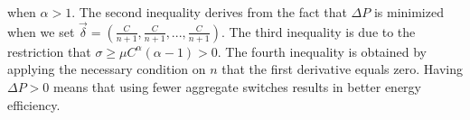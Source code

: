 \documentclass[journal,single-space,two column,twoside,10pt]{IEEEtran}
\begin{document}
when $\alpha > 1$. The second inequality derives from the fact that $\Delta P$ is minimized when we set $\vec{\delta} = \left( \frac{C}{n+1}, \frac{C}{n+1},..., \frac{C}{n+1} \right)$. The third inequality is due to the restriction that $\sigma \geq \mu C^{\alpha}(\alpha - 1) > 0$. The fourth inequality is obtained by applying the necessary condition on $n$ that the first derivative equals zero. Having $\Delta P> 0$ means that using fewer aggregate switches results in better energy efficiency. 

\nobalance
\end{document}

